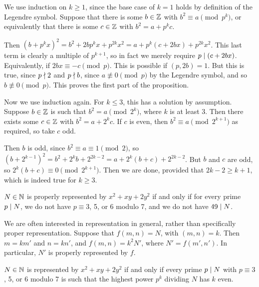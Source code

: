 \documentclass{article}
\begin{document}
\begin{prf}
    We use induction on $k \geq 1$, since the base case of $k = 1$ holds by definition of the Legendre symbol. Suppose that there is some $b \in \mathbb{Z}$ with $b^2 \equiv a \pmod{p^k}$, or equivalently that there is some $c \in \mathbb{Z}$ with $b^2 = a + p^k c$.
    
    Then $(b + p^k x)^2 = b^2 + 2bp^kx + p^{2k}x^2 = a + p^k(c + 2bx) + p^{2k}x^2$. This last term is clearly a multiple of $p^{k+1}$, so in fact we merely require $p \mid (c + 2bx)$. Equivalently, if $2bx \equiv -c \pmod{p}$.
    This is possible if $(p, 2b) = 1$.
    But this is true, since $p \nmid 2$ and $p \nmid b$, since $a \not\equiv 0 \pmod{p}$ by the Legendre symbol, and so $b \not\equiv 0 \pmod{p}$.
    This proves the first part of the proposition.
    
    Now we use induction again. For $k \leq 3$, this has a solution by assumption.
    Suppose $b \in \mathbb{Z}$ is such that $b^2 = a \pmod{2^k}$, where $k$ is at least 3. Then there exists some $c \in \mathbb{Z}$ with $b^2 = a + 2^k c$. If $c$ is even, then $b^2 \equiv a \pmod{2^{k+1}}$ as required, so take $c$ odd.
    
    Then $b$ is odd, since $b^2 \equiv a \equiv 1 \pmod{2}$, so $(b+2^{k-1})^2 = b^2 + 2^k b + 2^{2k-2} = a + 2^{k}(b+c) + 2^{2k-2}$. But $b$ and $c$ are odd, so $2^k(b+c) \equiv 0 \pmod{2^{k+1}}$.
    Then we are done, provided that $2k-2 \geq k+1$, which is indeed true for $k \geq 3$.
\end{prf}

\begin{corollary}
    $N \in \mathbb{N}$ is properly represented by $x^2 + xy + 2y^2$ if and only if for every prime $p \mid N$, we do not have $p \equiv 3$, 5, or 6 modulo 7, and we do not have $49 \mid N$.
\end{corollary}

We are often interested in representation in general, rather than specifically proper representation. Suppose that $f(m, n) = N$, with $(m, n) = k$. Then $m = km'$ and $n = kn'$, and $f(m, n) = k^2 N'$, where $N' = f(m', n')$. In particular, $N'$ is properly represented by $f$.

\begin{corollary}
    $N \in \mathbb{N}$ is represented by $x^2 + xy + 2y^2$ if and only if every prime $p \mid N$ with $p \equiv 3$, 5, or 6 modulo 7 is such that the highest power $p^k$ dividing $N$ has $k$ even.
\end{corollary}
\end{document}
